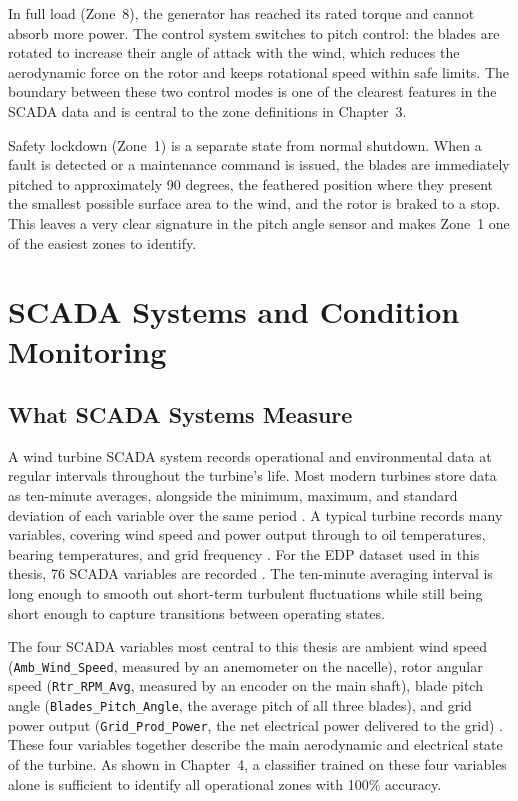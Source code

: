 In full load (Zone~8), the generator has reached its rated torque and cannot absorb more
power. The control system switches to pitch control: the blades are rotated to increase
their angle of attack with the wind, which reduces the aerodynamic force on the rotor and
keeps rotational speed within safe limits. The boundary between these two control modes
is one of the clearest features in the SCADA data and is central to the zone definitions
in Chapter~3.

Safety lockdown (Zone~1) is a separate state from normal shutdown. When a fault is
detected or a maintenance command is issued, the blades are immediately pitched to
approximately 90 degrees, the feathered position where they present the smallest possible
surface area to the wind, and the rotor is braked to a stop. This leaves a very clear
signature in the pitch angle sensor and makes Zone~1 one of the easiest zones to
identify.

\section{SCADA Systems and Condition Monitoring}
\label{sec:bg:scada}

\subsection{What SCADA Systems Measure}
\label{subsec:bg:scada:measure}

A wind turbine SCADA system records operational and environmental data at regular
intervals throughout the turbine's life. Most modern turbines store data as ten-minute
averages, alongside the minimum, maximum, and standard deviation of each variable over
the same period \citep{pandit2019}. A typical turbine records many variables, covering
wind speed and power output through to oil temperatures, bearing temperatures, and grid
frequency \citep{pandit2024, pandit2019}.
For the EDP dataset used in this thesis, 76 SCADA variables are recorded \citep{indrekvam2026}. The ten-minute averaging interval is long enough to smooth out
short-term turbulent fluctuations while still being short enough to capture transitions
between operating states.

The four SCADA variables most central to this thesis are ambient wind speed
(\texttt{Amb\_Wind\_Speed}, measured by an anemometer on the nacelle), rotor angular
speed (\texttt{Rtr\_RPM\_Avg}, measured by an encoder on the main shaft), blade pitch
angle (\texttt{Blades\_Pitch\_Angle}, the average pitch of all three blades), and grid
power output (\texttt{Grid\_Prod\_Power}, the net electrical power delivered to the
grid) \citep{indrekvam2026}. These four variables together describe the main
aerodynamic and electrical state of the turbine. As shown in Chapter~4, a classifier trained on these four variables alone
is sufficient to identify all operational zones with 100\% accuracy.

